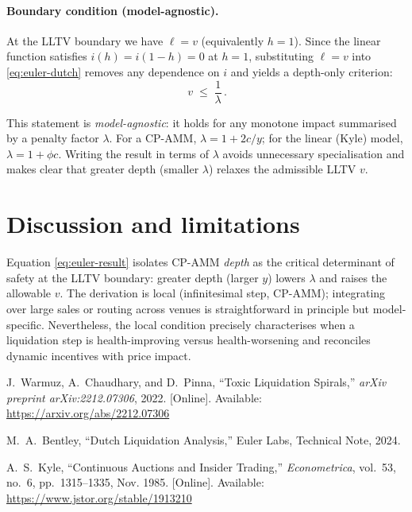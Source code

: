 \documentclass[11pt]{article}
\begin{document}
\paragraph{Boundary condition (model-agnostic).}
At the LLTV boundary we have $\ell = v$ (equivalently $h=1$). Since the linear function satisfies $i(h)=i(1-h)=0$ at $h=1$, substituting $\ell=v$ into \eqref{eq:euler-dutch} removes any dependence on $i$ and yields a depth-only criterion:
\begin{equation}
\boxed{\, v \;\le\; \frac{1}{\lambda}\,}.
\label{eq:euler-result}
\end{equation}

\noindent
This statement is \emph{model-agnostic}: it holds for any monotone impact summarised by a penalty factor $\lambda$. For a CP-AMM, $\lambda=1+2c/y$; for the linear (Kyle) model, $\lambda=1+\phi c$. Writing the result in terms of $\lambda$ avoids unnecessary specialisation and makes clear that greater depth (smaller $\lambda$) relaxes the admissible LLTV $v$.


\section{Discussion and limitations}
Equation \eqref{eq:euler-result} isolates CP-AMM \emph{depth} as the critical determinant of safety at the LLTV boundary: greater depth (larger \(y\)) lowers \(\lambda\) and raises the allowable \(v\). The derivation is local (infinitesimal step, CP-AMM); integrating over large sales or routing across venues is straightforward in principle but model-specific. Nevertheless, the local condition precisely characterises when a liquidation step is health-improving versus health-worsening and reconciles dynamic incentives with price impact.

\bigskip
\begin{thebibliography}{99}

J.~Warmuz, A.~Chaudhary, and D.~Pinna, 
``Toxic Liquidation Spirals,'' 
\emph{arXiv preprint arXiv:2212.07306}, 2022. [Online]. Available: \url{https://arxiv.org/abs/2212.07306}

M.~A.~Bentley, 
``Dutch Liquidation Analysis,'' 
Euler Labs, Technical Note, 2024.

A.~S.~Kyle, 
``Continuous Auctions and Insider Trading,'' 
\emph{Econometrica}, vol.~53, no.~6, pp.~1315--1335, Nov. 1985. [Online]. Available: \url{https://www.jstor.org/stable/1913210}

\end{thebibliography}
\end{document}
